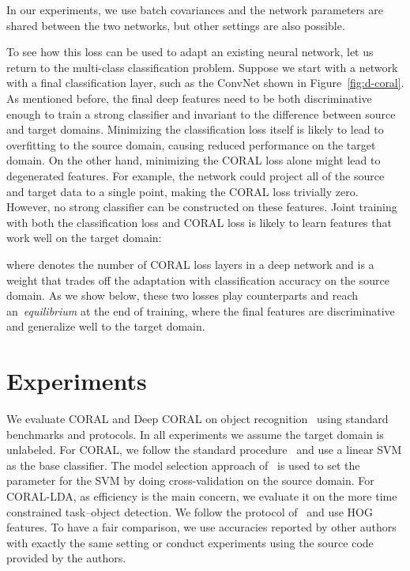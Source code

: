\documentclass[graybox]{svmult}
\begin{document}
      
In our experiments, we use batch covariances and the network parameters are shared between the two networks, but other settings are also possible.

To see how this loss can be used to adapt an existing neural network, let us return to the multi-class classification problem. Suppose we start with a network with a final classification layer, such as the ConvNet shown in Figure~\ref{fig:d-coral}.
As mentioned before, the final deep features need to be both discriminative enough to train a strong classifier and invariant to the difference between source and target domains. Minimizing the classification loss itself is likely to lead to overfitting to the source domain, causing reduced performance on the target domain. On the other hand, minimizing the CORAL loss alone might lead to degenerated features. For example, the network could project all of the source and target data to a single point, making the CORAL loss trivially zero. However, no strong classifier can be constructed on these features. Joint training with both the classification loss and CORAL loss is likely to learn features that work well on the target domain:
      
where  denotes the number of CORAL loss layers in a deep network and  is a weight that trades off the adaptation with classification accuracy on the source domain. As we show below, these two losses play counterparts and reach an~\emph{equilibrium} at the end of training, where the final features are discriminative and generalize well to the target domain. \section{Experiments}
\label{sec:exp}



We evaluate CORAL and Deep CORAL on object recognition~\cite{saenko2010adapting} using standard benchmarks and protocols. In all experiments we assume the target domain is unlabeled. For CORAL, we follow the standard procedure~\cite{sa,decaf} and use a linear SVM as the base classifier. The model selection approach of~\cite{sa} is used to set the  parameter for the SVM by doing cross-validation on the source domain. For CORAL-LDA, as efficiency is the main concern, we evaluate it on the more time constrained task--object detection. We follow the protocol of~\cite{ICRA14} and use HOG features. To have a fair comparison, we use accuracies reported by other authors with exactly the same setting or conduct experiments using the source code provided by the authors.
\end{document}

